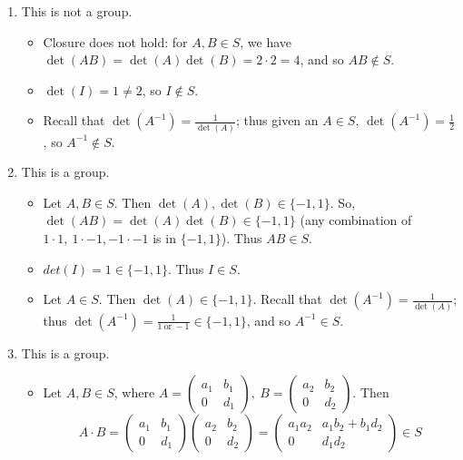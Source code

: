 \documentclass{homework}
\begin{document}
\begin{solution}
  \begin{enumerate}[label=(\alph*)]
    \item This is not a group.
      \begin{itemize}
        \item Closure does not hold: for $A,B\in S$, we have $\det(AB)=\det(A)\det(B)=2\cdot 2=4$,
          and so $AB\not\in S$.
        \item $\det(I)=1\neq 2$, so $I\not\in S$.
        \item Recall that $\det(A^{-1})=\frac{1}{\det(A)}$; thus given an $A\in S$,
          $\det(A^{-1})=\frac{1}{2}$, so $A^{-1}\not\in S$.
      \end{itemize}
    \item This is a group.
      \begin{itemize}
        \item Let $A,B\in S$. Then $\det(A),\det(B)\in \{ -1,1 \}$. So, $\det(AB)=\det(A)\det(B)\in
          \{ -1,1 \}$ (any combination of $1\cdot 1,\ 1\cdot -1, -1\cdot -1$ is in $\{ -1,1 \}$).
          Thus $AB\in S$.
        \item $det(I)=1\in \{ -1,1 \}$. Thus $I\in S$.
        \item Let $A\in S$. Then $\det(A)\in \{ -1,1 \}$. Recall that
          $\det(A^{-1})=\frac{1}{\det(A)}$; thus $\det(A^{-1})=\frac{1}{1~\text{or}~-1}\in \{ -1,1
          \}$, and so $A^{-1}\in S$.
      \end{itemize}
    \item This is a group.
      \begin{itemize}
        \item Let $A,B\in S$, where $A=\begin{pmatrix} a_1&b_1\\0&d_1 \end{pmatrix},\
          B=\begin{pmatrix} a_2&b_2\\0&d_2 \end{pmatrix}  $. Then \[
          A\cdot B = \begin{pmatrix} a_1&b_1\\0&d_1 \end{pmatrix} \begin{pmatrix} a_2&b_2\\0&d_2
          \end{pmatrix}=\begin{pmatrix} a_1a_2&a_1b_2+b_1d_2\\0&d_1d_2 \end{pmatrix}  \in S
\]
\end{itemize}
\end{enumerate}
\end{solution}
\end{document}
